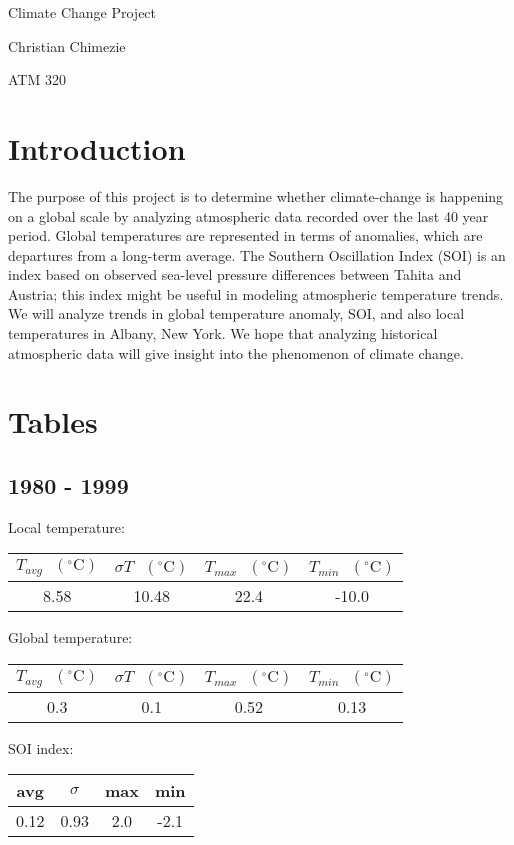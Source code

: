 \documentclass[12pt]{article}
\begin{document}
{\LARGE Climate Change Project}

{\large Christian Chimezie}

{\large ATM 320}

\noindent\makebox[\linewidth]{\rule{16.51cm}{0.4pt}}

\section*{Introduction}
The purpose of this project is to determine whether climate-change is
happening on a global scale by analyzing atmospheric data recorded
over the last 40 year period.
Global temperatures are represented in terms of anomalies,
which are departures from a long-term average.
The Southern Oscillation Index (SOI) is an index based on observed
sea-level pressure differences between Tahita and Austria;
this index might be useful in modeling atmospheric temperature
trends.
We will analyze trends in global temperature anomaly, SOI, and also
local temperatures in Albany, New York.
We hope that analyzing historical atmospheric data will give insight
into the phenomenon of climate change.

\section*{Tables}
\subsection*{1980 - 1999}
Local temperature:
\begin{center}
\begin{tabular}{c | c | c | c}
	$T_{avg} \textrm{ } (^{\circ} \textrm{C})$ &
	$\sigma T \textrm{ } (^{\circ} \textrm{C})$ &
	$T_{max} \textrm{ } (^{\circ} \textrm{C})$ &
	$T_{min} \textrm{ } (^{\circ} \textrm{C})$ \\ %
	\hline
	8.58 & 10.48 & 22.4 & -10.0 \\ %
\end{tabular}
\end{center}
Global temperature:
\begin{center}
\begin{tabular}{c | c | c | c}
	$T_{avg} \textrm{ } (^{\circ} \textrm{C})$ &
	$\sigma T \textrm{ } (^{\circ} \textrm{C})$ &
	$T_{max} \textrm{ } (^{\circ} \textrm{C})$ &
	$T_{min} \textrm{ } (^{\circ} \textrm{C})$ \\ %
	\hline
	0.3 & 0.1 & 0.52 & 0.13 \\ %
\end{tabular}
\end{center}
SOI index:
\begin{center}
\begin{tabular}{c | c | c | c}
	avg & $\sigma$ & max & min \\ %
	\hline
	0.12 & 0.93 & 2.0 & -2.1 \\ %
\end{tabular}
\end{center}
\end{document}
